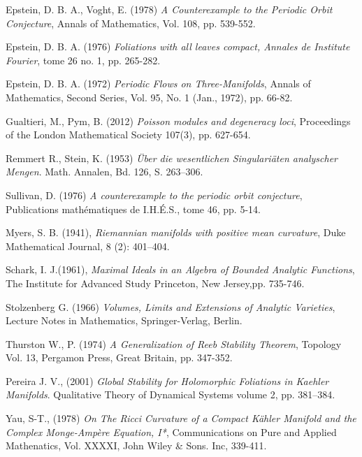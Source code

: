\documentclass[letterpaper]{book}
\begin{document}
\begin{thebibliography}{3}
 Epstein, D. B. A., Voght, E. (1978) \textit{A Counterexample to the Periodic Orbit Conjecture},
Annals of Mathematics, Vol. 108, pp. 539-552.

 Epstein, D. B. A. (1976) \textit{Foliations with all leaves compact, Annales de Institute Fourier},
tome 26 no. 1, pp. 265-282.

 Epstein, D. B. A. (1972) \textit{Periodic Flows on Three-Manifolds}, Annals of Mathematics,
Second Series, Vol. 95, No. 1 (Jan., 1972), pp. 66-82.

 Gualtieri, M., Pym, B. (2012) \textit{Poisson modules and degeneracy loci},
Proceedings of the London Mathematical Society 107(3), pp. 627-654.

 Remmert R., Stein, K. (1953) \textit{Über die wesentlichen
Singulariäten analyscher Mengen}. Math. Annalen, Bd. 126, S. 263--306.

 Sullivan, D. (1976) \textit{A counterexample to the  periodic orbit conjecture}, Publications mathématiques de I.H.É.S., tome 46, pp. 5-14.

 Myers, S. B. (1941), \textit{Riemannian manifolds with positive mean curvature}, Duke Mathematical Journal,
8 (2): 401–404.

 Schark, I. J.(1961), \textit{Maximal Ideals in an Algebra of Bounded Analytic Functions}, The Institute for Advanced Study
Princeton, New Jersey,pp. 735-746.

 Stolzenberg G. (1966) \textit{Volumes, Limits and
Extensions of Analytic Varieties}, Lecture Notes in Mathematics,
Springer-Verlag, Berlin.

 Thurston W., P. (1974) \textit{A Generalization of Reeb Stability Theorem}, Topology Vol. 13,
Pergamon Press, Great Britain, pp. 347-352.

 Pereira J. V., (2001) \textit{Global Stability for Holomorphic Foliations in Kaehler Manifolds}.
Qualitative Theory of Dynamical Systems volume 2, pp. 381–384.

 Yau, S-T., (1978) \textit{On The Ricci Curvature of a Compact K\"ahler Manifold and the Complex Monge-Amp\`ere Equation, I*},
Communications on Pure and Applied Mathenatics, Vol. XXXXI, John Wiley \& Sons. Inc, 339-411.
\end{thebibliography}
\end{document}
